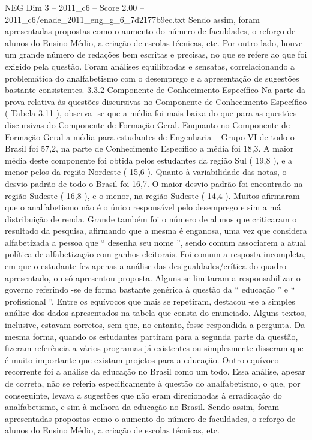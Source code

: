 \begin{textsample}{NEG Dim 3 – 2011\_c6 – Score 2.00 – 2011\_c6/enade\_2011\_eng\_g\_6\_7d2177b9ec.txt}
Sendo assim, foram apresentadas propostas como o aumento do número de faculdades, o reforço de alunos do Ensino Médio, a criação de escolas técnicas, etc.
Por outro lado, houve um grande número de redações bem escritas e precisas, no que se refere ao que foi exigido pela questão.
Foram análises equilibradas e sensatas, correlacionando a problemática do analfabetismo com o desemprego e a apresentação de sugestões bastante consistentes. 3.3.2 Componente de Conhecimento Específico Na parte da prova relativa às questões discursivas no Componente de Conhecimento Específico ( Tabela 3.11 ), observa -se que a média foi mais baixa do que para as questões discursivas do Componente de Formação Geral.
Enquanto no Componente de Formação Geral a média para estudantes de Engenharia – Grupo VI de todo o Brasil foi 57,2, na parte de Conhecimento Específico a média foi 18,3.
A maior média deste componente foi obtida pelos estudantes da região Sul ( 19,8 ), e a menor pelos da região Nordeste ( 15,6 ).
Quanto à variabilidade das notas, o desvio padrão de todo o Brasil foi 16,7.
O maior desvio padrão foi encontrado na região Sudeste ( 16,8 ), e o menor, na região Sudeste ( 14,4 ).
Muitos afirmaram que o analfabetismo não é o único responsável pelo desemprego e sim a má distribuição de renda.
Grande também foi o número de alunos que criticaram o resultado da pesquisa, afirmando que a mesma é enganosa, uma vez que considera alfabetizada a pessoa que “ desenha seu nome ”, sendo comum associarem a atual política de alfabetização com ganhos eleitorais.
Foi comum a resposta incompleta, em que o estudante fez apenas a análise das desigualdades/crítica do quadro apresentado, ou só apresentou proposta.
Alguns se limitaram a responsabilizar o governo referindo -se de forma bastante genérica à questão da “ educação ” e “ profissional ”.
Entre os equívocos que mais se repetiram, destacou -se a simples análise dos dados apresentados na tabela que consta do enunciado.
Alguns textos, inclusive, estavam corretos, sem que, no entanto, fosse respondida a pergunta.
Da mesma forma, quando os estudantes partiram para a segunda parte da questão, fizeram referência a vários programas já existentes ou simplesmente disseram que é muito importante que existam projetos para a educação.
Outro equívoco recorrente foi a análise da educação no Brasil como um todo.
Essa análise, apesar de correta, não se referia especificamente à questão do analfabetismo, o que, por conseguinte, levava a sugestões que não eram direcionadas à erradicação do analfabetismo, e sim à melhora da educação no Brasil.
Sendo assim, foram apresentadas propostas como o aumento do número de faculdades, o reforço de alunos do Ensino Médio, a criação de escolas técnicas, etc.

\end{textsample}
